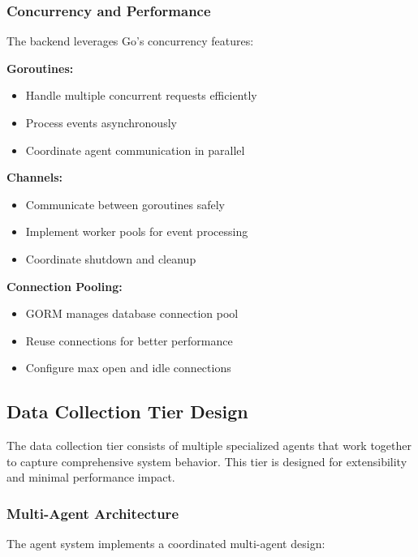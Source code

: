 \subsubsection{Concurrency and Performance}

The backend leverages Go's concurrency features:

\textbf{Goroutines:}
\begin{itemize}
    \item Handle multiple concurrent requests efficiently
    \item Process events asynchronously
    \item Coordinate agent communication in parallel
\end{itemize}

\textbf{Channels:}
\begin{itemize}
    \item Communicate between goroutines safely
    \item Implement worker pools for event processing
    \item Coordinate shutdown and cleanup
\end{itemize}

\textbf{Connection Pooling:}
\begin{itemize}
    \item GORM manages database connection pool
    \item Reuse connections for better performance
    \item Configure max open and idle connections
\end{itemize}

\subsection{Data Collection Tier Design}

The data collection tier consists of multiple specialized agents that work together to capture comprehensive system behavior. This tier is designed for extensibility and minimal performance impact.

\subsubsection{Multi-Agent Architecture}

The agent system implements a coordinated multi-agent design:

